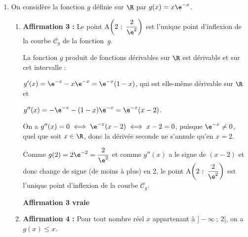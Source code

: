 \begin{enumerate}
\begin{enumerate}
Or, d'après le tableau de variations de $f$, $\ds\lim_{x\to -\infty} f(x)=5$ et $\ds\lim_{x\to +\infty} f(x)=1$.

\hfill\textbf{Affirmation 1 fausse}

		\item \textbf{Affirmation 2:}
\og  $\displaystyle\lim_{x \to - \infty} \dfrac{2}{f(x) - 5} = + \infty$. \fg{}

D'après le tableau de variations de $f$, celle-ci est décroissante sur l'intervalle $]- \infty~;~-2[$, donc sur cet intervalle $f(x) < 5$ et donc $f(x)-5<0$.

Comme $\displaystyle\lim_{x \to - \infty} f(x) = 5$, on a donc $\displaystyle\lim_{x \to - \infty} f(x) - 5 = 0^{-}$ et donc\\
 $\displaystyle\lim_{x \to - \infty} \dfrac{1}{f(x) - 5} = - \infty$ et enfin  $\displaystyle\lim_{x \to - \infty} \dfrac{2}{f(x) - 5} = - \infty$.
 
 \hfill\textbf{Affirmation 2 fausse}
	\end{enumerate}
	
\item On considère la fonction $g$ définie sur $\R$ par $g(x) = x\e^{-x}$.
	\begin{enumerate}
	
		\item \textbf{Affirmation 3 :} 
\og  Le point A$\left(2~;~\dfrac{2}{\e^2}\right)$ est l'unique point d'inflexion de la courbe $\mathcal{C}_g$ de la fonction~$g$. \fg{} 

La fonction $g$ produit de fonctions dérivables sur $\R$ est dérivable et sur cet intervalle :

$g'(x) = \e^{-x} - x\e^{-x} = \e^{-x}(1 - x)$, qui est elle-même dérivable sur $\R$ et 

$g''(x) = -\e^{-x} - (1 - x)\e^{-x} = \e^{-x}(x - 2)$.

On a $g''(x) = 0 \iff \e^{-x}(x - 2) \iff x - 2 = 0$, puisque $\e^{-x} \ne 0$, quel que soit $x \in \R$, donc la dérivée seconde ne s'annule qu'en $x = 2$.

Comme $g(2) = 2\e^{-2} = \dfrac{2}{\e^2}$ et comme $g''(x)$ a le signe de $(x - 2)$ et donc change de signe (de moins à plus) en 2, le point A$\left(2~;~\dfrac{2}{\e^2}\right)$ est l'unique point d'inflexion de la courbe $\mathcal{C}_g$.

 \hfill\textbf{Affirmation 3 vraie}
 
		\item \textbf{Affirmation 4 :} 
\og  Pour tout nombre réel $x$ appartenant à $] - \infty~;~2[$, on a $g(x) \leqslant x$. \fg{} 


\end{enumerate}
\end{enumerate}
